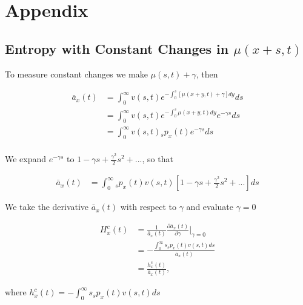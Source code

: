 \documentclass[12pt]{article}
\begin{document}
{

\newpage


\FloatBarrier
\newpage
\appendix
\section{Appendix}


\subsection{Entropy with Constant Changes in $\mu(x+s,t)$}\label{sec:EntropyConst}

To measure constant changes we make $\mu(s,t)+\gamma$, then

\begin{equation}\label{eq:EntropyConst1}
\begin{split}
\bar{a}_{x}(t) &= \int_0^\infty{v}(s,t) e^{-\int_{0}^{s} [\mu(x+y,t)+\gamma]dy}ds \\
&= \int_0^\infty {v}(s,t)e^{-\int_{0}^{s} \mu(x+y,t)dy} e^{-\gamma s}ds \\
&= \int_0^\infty {v}(s,t){}_sp_x(t) e^{-\gamma s}ds \\
\end{split}
\end{equation}

We expand $e^{-\gamma s}$ to $1-\gamma s+\frac{\gamma^2}{2} s^{2} +...$, so that


\begin{equation}\label{eq:EntropyConst2}
\begin{split}
\bar{a}_{x}(t) &= \int_0^\infty {}_sp_x(t) {v}(s,t)[1-\gamma s+\frac{\gamma^2}{2} s^{2} +...]ds
\end{split}
\end{equation}

We take the derivative $\bar{a}_{x}(t)$ with respect to $\gamma$ and evaluate $\gamma=0$


\begin{equation}\label{eq:EntropyConst3}
\begin{split}
{H}^{c}_x(t)&=\frac{1}{\bar{a}_x(t)}\frac{\partial \bar{a}_x(t)}{\partial \gamma} \bigg\rvert_{\gamma=0}\\
&= -\frac{\int_0^\infty s {}_sp_x(t) {v}(s,t)ds}{\bar{a}_x(t)} \\
&= \frac{{h}^{c}_x(t)}{\bar{a}_x(t)},
\end{split}
\end{equation}

where ${h}^{c}_x(t)=-\int_0^\infty s {}_sp_x(t) {v}(s,t)ds$



}
\end{document}
